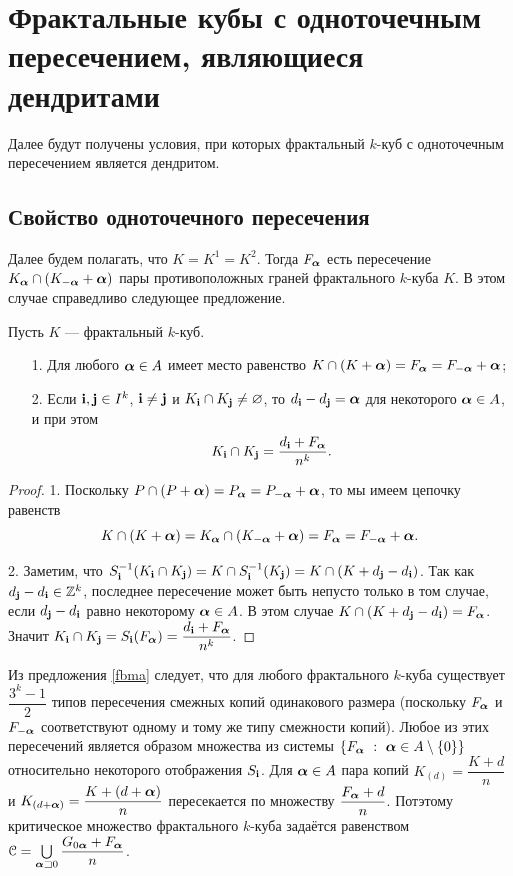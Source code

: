 \section{Фрактальные кубы с одноточечным пересечением, являющиеся дендритами}

Далее будут получены условия, при которых фрактальный $k$-куб с одноточечным пересечением является дендритом.

\subsection{Свойство одноточечного пересечения}

Далее будем полагать, что $K=K^1=K^2$.
Тогда $F_{\bm{\alpha}}$ есть пересечение $K_{\bm{\alpha}}\cap(K_{-{\bm{\alpha}}}+{\bm{\alpha}})$ пары противоположных граней фрактального $k$-куба $K$.
В этом случае справедливо следующее предложение.

\begin{proposition}\label{fbma}
Пусть $K$ --- фрактальный $k$-куб.
\begin{itemize}[nolistsep]
\item[1.] Для любого ${\bm{\alpha}}\in A$ имеет место равенство $K\cap(K+{\bm{\alpha}})=F_{\bm{\alpha}}=F_{-{\bm{\alpha}}}+{\bm{\alpha}} $;
\item[2.] Если ${\bf{i}},{\bf{j}} \in I^k$, ${\bf{i}}\neq {\bf{j}}$ и $K_{\bf{i}}\cap K_{\bf{j}}\neq\varnothing$, то $d_{\bf{i}}-d_{\bf{j}}={\bm{\alpha}}$ для некоторого ${\bm{\alpha}}\in A$, и при этом 
$$K_{\bf{i}}\cap K_{\bf{j}}=\dfrac{d_{\bf{i}}+F_{\bm{\alpha}}}{n^k}.$$
\end{itemize}
\end{proposition}

\begin{proof}
1. Поскольку $P\cap (P+{\bm{\alpha}})=P_{\bm{\alpha}}=P_{-{\bm{\alpha}}}+{\bm{\alpha}}$, то мы имеем цепочку равенств 
$$K\cap(K+{\bm{\alpha}})= K_{\bm{\alpha}}\cap (K_{-{\bm{\alpha}}}+{\bm{\alpha}})=F_{\bm{\alpha}}=F_{-{\bm{\alpha}}}+{\bm{\alpha}}.$$

2. Заметим, что $S_{\bf{i}}^{-1}(K_{\bf{i}}\cap K_{\bf{j}})=K\cap S_{\bf{i}}^{-1}(K_{\bf{j}})=K\cap (K+d_{\bf{j}}-d_{\bf{i}})$. 
Так как $d_{\bf{j}}-d_{\bf{i}}\in\mathbb{Z}^k$, последнее пересечение может быть непусто только в том случае, если $d_{\bf{j}}-d_{\bf{i}}$ равно некоторому ${\bm{\alpha}}\in A$. 
В этом случае $K\cap(K+d_{\bf{j}}-d_{\bf{i}})=F_{\bm{\alpha}}$.
Значит $K_{\bf{i}}\cap K_{\bf{j}}= S_{\bf{i}}(F_{\bm{\alpha}})= \dfrac{d_{\bf{i}}+F_{\bm{\alpha}}}{n^k}$. 
\end{proof}

Из предложения \ref{fbma} следует, что для любого фрактального $k$-куба существует $\dfrac{3^k-1}{2}$ типов пересечения смежных копий одинакового размера (поскольку $F_{\bm{\alpha}}$ и $F_{-{\bm{\alpha}}}$ соответствуют одному и тому же типу смежности копий). 
Любое из этих пересечений является образом множества из системы $\{F_{\bm{\alpha}}\ :\ {\bm{\alpha}}\in A\setminus\{0\}\}$ относительно некоторого отображения $S_{\bf{i}}$. 
Для ${\bm{\alpha}}\in A$ пара копий $K_{(d)}=\dfrac{K+d}{n}$ и $K_{(d+{\bm{\alpha}})}=\dfrac{K+(d+{\bm{\alpha}})}{n}$ пересекается по множеству $\dfrac{F_{\bm{\alpha}}+d}{n}$.
Потэтому критическое множество фрактального $k$-куба задаётся равенством 
${\EuScript C}=\bigcup\limits_{{\bm{\alpha}}\sqsupset0}\dfrac{G_{0{\bm{\alpha}}}+F_{\bm{\alpha}}}{n}$.

